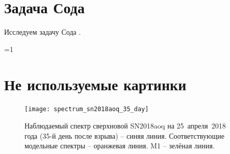 \documentclass[a4paper,12pt]{extarticle}
\newcounter{basement}
\begin{document}
\section{Задача Сода }

Исследуем задачу Сода \cite{sod1978}.




\printbibliography


\ifnum \value{basement}=1

\newpage


\section*{Не используемые картинки}


%
\begin{figure}[!htb]
	\centering
	\texttt{[image: spectrum\_sn2018aoq\_35\_day]}
	\caption{
		Наблюдаемый спектр сверхновой SN2018aoq
		на 25~апреля~2018 года (35-й день после взрыва) -- синяя линия.
		Соответствующие модельные спектры
		\tardis -- оранжевая линия.
		M1 -- зелёная линия.
	}
	\label{fig:spectrum_sn2018aoq_35_day}
\end{figure}

\fi
\end{document}
